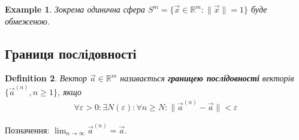 \documentclass[a4paper, 10pt]{article}
\makeatletter
\def\huge{\displaystyle}
\def\qed{$\blacksquare$}
\theoremstyle{theoremdd}
\newtheorem{theorem}{Theorem}[subsection]
\theoremstyle{theoremdd}
\theoremstyle{theoremdd}
\newtheorem{definition}[theorem]{Definition}
\theoremstyle{theoremdd}
\theoremstyle{theoremdd}
\newtheorem{example}[theorem]{Example}
\theoremstyle{theoremdd}
\theoremstyle{theoremdd}
\theoremstyle{theoremdd}
\theoremstyle{theoremdd}
\renewenvironment{proof}[1][Proof.\\]{\par
\pushQED{\hfill \qed}%
\normalfont \topsep6\p@\@plus6\p@\relax
\trivlist
\item\relax
{\bfseries
#1\@addpunct{.}}\hspace\labelsep\ignorespaces
}{%
\popQED\endtrivlist\@endpefalse
}
\newcommand\Norm[1]{\lVert#1\rVert}
\makeatother
\begin{document}
\begin{example}
Зокрема одинична сфера $S^m = \{ \vec{x} \in \mathbb{R}^m: \Norm{\vec{x}} =1 \}$ буде обмеженою.
\end{example}

\iffalse
\begin{theorem}[Лема Кантора про вкладеність]
Задамо прямокутники $\Pi_n = [a_n,b_n] \times [c_n,d_n]$, які є вкладеними, тобто $\Pi_1 \supset \Pi_2 \supset \dots$. Тоді:\\
1) $\exists \vec{c} \in \mathbb{R}^2: \forall n \geq 1: \vec{c} \in \Pi_n$\\
2) Якщо додатково $\text{diam } \Pi_n \to 0, n \to \infty$, то тоді така точка - єдина. $\text{diam } A =\huge \sup_{\vec{x},\vec{y} \in A} \lVert \vec{x}-\vec{y} \rVert$
\end{theorem}

\begin{proof}
Зауважимо, що $\Pi_{n+1} \subset \Pi_n \iff \begin{cases} [a_{n+1},b_{n+1}] \subset [a_n,b_n] \\ [c_{n+1},d_{n+1}] \subset [c_n,d_n] \end{cases}$. Доводиться простенько.\\
Тоді ми маємо систему з вкладених відрізків. Тоді за лемою Кантора в матані $\mathbb{R}$, маємо, що:\\
$\exists \alpha \in \mathbb{R}: \forall n \geq 1: \alpha \in [a_n,b_n]$ та $\exists \beta \in \mathbb{R}: \forall n \geq 1: \beta \in [c_n,d_n]$. Встановимо $\vec{c} = \begin{pmatrix}
\alpha \\ \beta
\end{pmatrix}$. Тоді за декартовим добутком, $\forall n \geq 1: \vec{c} \in \Pi_n$.\\
Тепер нехай $\text{diam } \Pi_n \to 0, n \to \infty$. Тоді це означає, що $\huge \sup_{\vec{x},\vec{y} \in \Pi_n} \lVert \vec{x}-\vec{y} \rVert \to 0 \implies \\ \forall \varepsilon > 0: \exists N: \forall n \geq N: \forall \vec{x},\vec{y} \in \Pi_n: \lVert \vec{x}-\vec{y} \rVert < \varepsilon \implies \begin{cases} |x_1-y_1| < \varepsilon \\ |x_2-y_2| < \varepsilon \end{cases}$.
\end{proof}
\fi

\subsection{Границя послідовності}
\begin{definition}
Вектор $\vec{a} \in \mathbb{R}^m$ називається \textbf{границею послідовності} векторів $\{\vec{a}^{(n)}, n \geq 1 \}$, якщо
\begin{align*}
\forall \varepsilon > 0: \exists N(\varepsilon): \forall n \geq N: \Norm{\vec{a}^{(n)} - \vec{a}} < \varepsilon
\end{align*}
\end{definition}
Позначення: $\huge \lim_{n \to \infty} \vec{a}^{(n)} = \vec{a}$.
\end{document}
